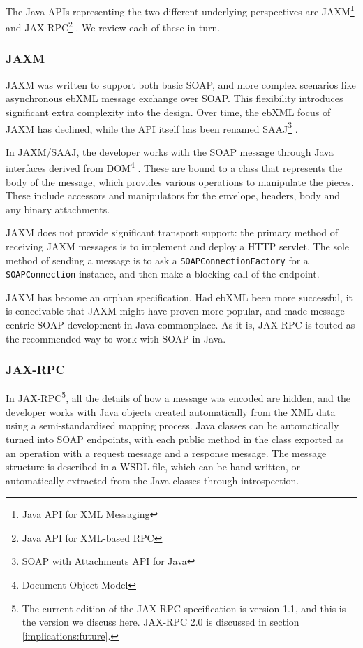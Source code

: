 The Java APIs representing the two different underlying perspectives
are JAXM\footnote{Java API for XML Messaging}
\cite{spec:JAX-M-11} and JAX-RPC\footnote{Java API for XML-based RPC}
\cite{spec:JAX-RPC-11}. We review each of these in turn.

\subsubsection{JAXM}
\label{intro:jaxm}

JAXM was written to support both basic SOAP, and more complex
scenarios like asynchronous ebXML message exchange over SOAP. This
flexibility introduces significant extra complexity into the design.
Over time, the ebXML focus of JAXM has declined, while the API itself
has been renamed SAAJ\footnote{SOAP with Attachments API for Java}
\cite{spec:SAAJ-12}.

In JAXM/SAAJ, the developer works with the SOAP message through Java
interfaces derived from DOM\footnote{Document Object Model}
\cite{spec:DOM}. These are bound to a class that represents the body
of the message, which provides various operations to manipulate the
pieces. These include accessors and manipulators for the envelope,
headers, body and any binary attachments.

JAXM does not provide significant transport support: the primary
method of receiving JAXM messages is to implement and deploy a HTTP
servlet.  The sole method of sending a message is to ask a
{\tt SOAPConnectionFactory} for a {\tt SOAPConnection} instance, and
then make a blocking call of the endpoint.

JAXM has become an orphan specification. Had ebXML been more
successful, it is conceivable that JAXM might have proven more
popular, and made message-centric SOAP development in Java
commonplace. As it is, JAX-RPC is touted as the recommended way to
work with SOAP in Java.

\subsubsection{JAX-RPC}
\label{intro:jax-rpc}

In JAX-RPC\footnote{The current edition of the JAX-RPC specification
is version 1.1, and this is the version we discuss here. JAX-RPC 2.0
is discussed in section \ref{implications:future}.}, all the details of
how a message was encoded are hidden, and the developer works with
Java objects created automatically from the XML data using a
semi-standardised mapping process. Java classes can be automatically
turned into SOAP endpoints, with each public method in the class
exported as an operation with a request message and a response
message. The message structure is described in a WSDL file, which can
be hand-written, or automatically extracted from the Java classes
through introspection.


